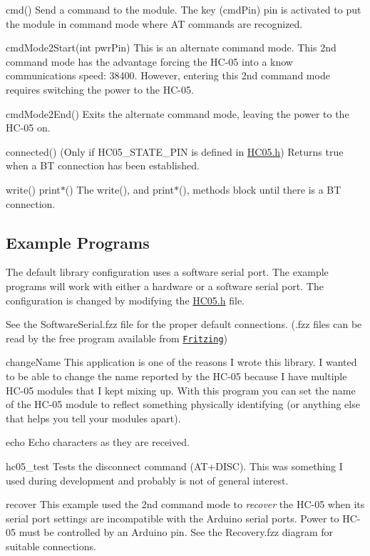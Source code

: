 {\ttfamily cmd()} Send a command to the module. The \textquotesingle{}key\textquotesingle{} (cmd\+Pin) pin is activated to put the module in command mode where \textquotesingle{}AT\textquotesingle{} commands are recognized.

{\ttfamily cmd\+Mode2\+Start(int pwr\+Pin)} This is an alternate command mode. This 2nd command mode has the advantage forcing the H\+C-\/05 into a know communications speed\+: 38400. However, entering this 2nd command mode requires switching the power to the H\+C-\/05.

{\ttfamily cmd\+Mode2\+End()} Exits the alternate command mode, leaving the power to the H\+C-\/05 on.

{\ttfamily connected()} (Only if H\+C05\+\_\+\+S\+T\+A\+T\+E\+\_\+\+P\+IN is defined in {\ttfamily \hyperlink{_h_c05_8h}{H\+C05.\+h}}) Returns true when a BT connection has been established.

{\ttfamily write()} {\ttfamily print$\ast$()} The write(), and print$\ast$(), methods block until there is a BT connection.

\subsection*{Example Programs }

The default library configuration uses a software serial port. The example programs will work with either a hardware or a software serial port. The configuration is changed by modifying the {\ttfamily \hyperlink{_h_c05_8h}{H\+C05.\+h}} file.

See the {\ttfamily Software\+Serial.\+fzz} file for the proper default connections. ({\ttfamily .fzz} files can be read by the free program available from \href{http://fritzing.org/home/}{\tt Fritzing})

{\ttfamily change\+Name} This application is one of the reasons I wrote this library. I wanted to be able to change the name reported by the H\+C-\/05 because I have multiple H\+C-\/05 modules that I kept mixing up. With this program you can set the name of the H\+C-\/05 module to reflect something physically identifying (or anything else that helps you tell your modules apart).

{\ttfamily echo} Echo characters as they are received.

{\ttfamily hc05\+\_\+test} Tests the disconnect command (A\+T+\+D\+I\+SC). This was something I used during development and probably is not of general interest.

{\ttfamily recover} This example used the 2nd command mode to {\itshape recover} the H\+C-\/05 when its serial port settings are incompatible with the Arduino serial ports. Power to H\+C-\/05 must be controlled by an Arduino pin. See the {\ttfamily Recovery.\+fzz} diagram for suitable connections.

